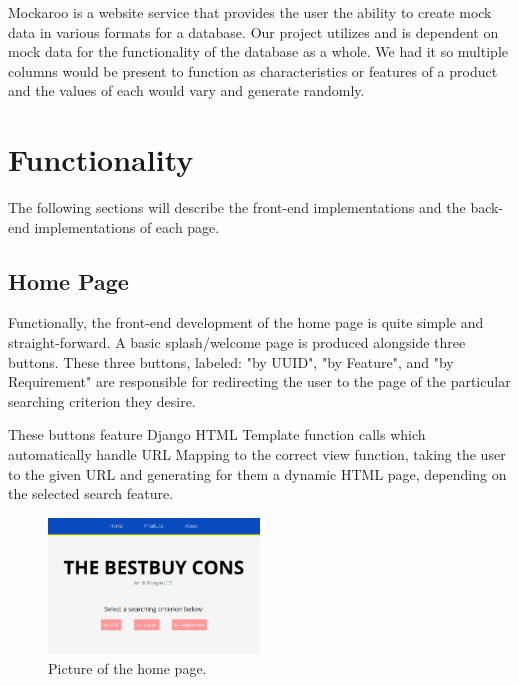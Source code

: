 \documentclass[sigconf]{acmart}
\begin{document}
Mockaroo is a website service that provides the user the ability to create mock data in various formats for a database. Our project utilizes and is dependent on mock data for the functionality of the database as a whole. We had it so multiple columns would be present to function as characteristics or features of a product and the values of each would vary and generate randomly.

\section{Functionality}\label{functionality}
The following sections will describe the front-end implementations and the back-end implementations of each page.

\subsection{Home Page}\label{home}

Functionally, the front-end development of the home page is quite simple and straight-forward. A basic splash/welcome page is produced alongside three buttons. These three buttons, labeled: "by UUID", "by Feature", and "by Requirement" are responsible for redirecting the user to the page of the particular searching criterion they desire. \par
These buttons feature Django HTML Template function calls which automatically handle URL Mapping to the correct view function, taking the user to the given URL and generating for them a dynamic HTML page, depending on the selected search feature. 

\begin{figure}[H] %
	\centering %
	\includegraphics[width=0.5\textwidth]{Figures/index.png} %
	\caption{Picture of the home page.}
\end{figure}
\end{document}
